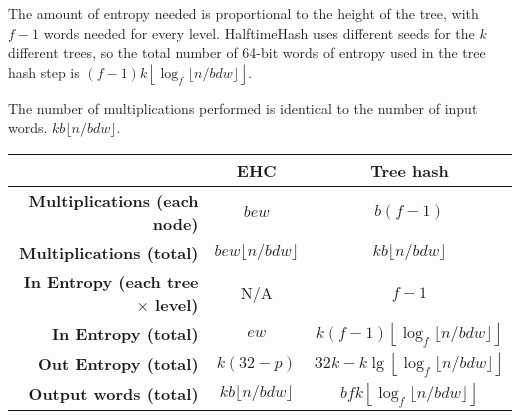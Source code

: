 \documentclass[runningheads]{llncs}
\begin{document}

The amount of entropy needed is proportional to the height of the tree, with $f - 1$ words needed for every level.
HalftimeHash uses different seeds for the $k$ different trees, so the total number of 64-bit words of entropy used in the tree hash step is $(f - 1) k\left\lfloor\log_f \lfloor n/b d w\rfloor\right\rfloor$.

The number of multiplications performed is identical to the number of input words. $k b \lfloor n / b d w \rfloor$.


\begin{tabular}{|r|c|c|}
  \hline & {\bf EHC} & {\bf Tree hash}\\
  \hline {\bf Multiplications (each node)} & $b e w$ & $b (f-1)$ \\
  \hline {\bf Multiplications (total)} & $b e w \lfloor n / b d w\rfloor$ & $k b \lfloor n / b d w \rfloor$ \\
  \hline {\bf In Entropy (each tree $\times$ level)} & N/A & $f-1$ \\
  \hline {\bf In Entropy (total)} & $e w$ & $k (f-1) \left\lfloor \log_f \lfloor n / b d w \rfloor \right\rfloor$ \\
  \hline {\bf Out Entropy (total)} & $k (32-p)$ & $32k - k\lg\left\lfloor\log_f \lfloor n/b d w\rfloor\right\rfloor$\\
  \hline {\bf Output words (total)} & $k b \lfloor n / b d w\rfloor $ & $b f k \left\lfloor \log_f \lfloor n / b d w \rfloor \right\rfloor$\\
  \hline
\end{tabular}
\end{document}
